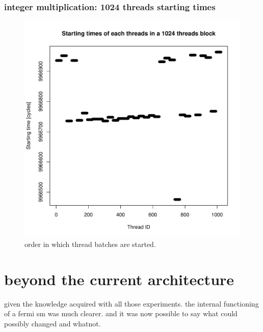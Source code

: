 \documentclass{report}
\def \scalingfactor{.8}
\begin{document}
	\subsection{integer multiplication: 1024 threads starting times}
    \begin{figure}[h]
    		\centering
		\vspace{-20pt}
	    	\includegraphics[width=\scalingfactor\linewidth]{"graphics/starting_times_ratio31"}
	    	\vspace{-15pt}
	    	\captionsetup{justification=centering}    
	    	\caption{order in which thread batches are started.}
    \end{figure}
\chapter{beyond the current architecture}
    given the knowledge acquired with all those experiments. the internal functioning of a fermi sm was much clearer. and it was now possible to say what could possibly changed and whatnot.
\end{document}
